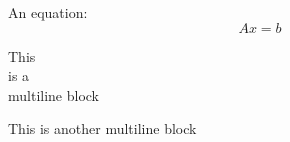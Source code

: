 \documentclass[11pt]{article}
\begin{document}
An equation:
\[
Ax = b
\]
\begin{obeylines}
This
is a
multiline block
\end{obeylines}
{\obeylines
This is
another
multiline block
}
\end{document}
